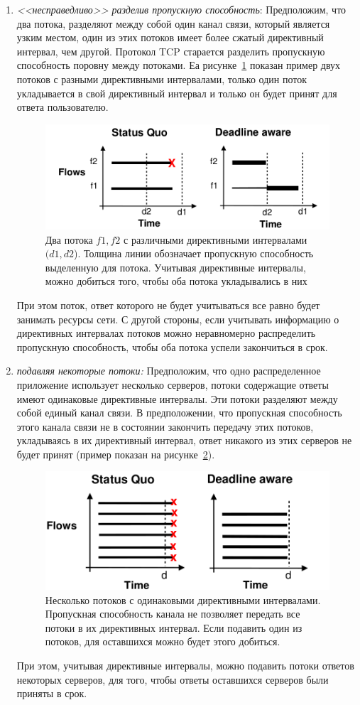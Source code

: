 \documentclass[14pt, a4paper,oneside]{extarticle}
\begin{document}
\begin{enumerate}
\item \emph{<<несправедливо>> разделив пропускную способность}: 
Предположим, что два потока, разделяют между собой один канал связи, который является узким местом, один из этих потоков имеет более сжатый директивный интервал, чем другой. Протокол TCP старается разделить пропускную способность поровну между потоками. Еа рисунке~\ref{fairness_two_flow} показан пример двух потоков с разными директивными интервалами, только один поток укладывается в свой директивный интервал и только он будет принят для ответа пользователю. 
\begin{figure}
	\includegraphics[width=0.7\linewidth]{fairness_two_flow}
	\caption{Два потока $f1, f2$ с различными директивными интервалами $(d1, d2$). Толщина линии обозначает пропускную способность выделенную для потока. Учитывая директивные интервалы, можно добиться того, чтобы оба потока укладывались в них}
	\label{fairness_two_flow}
\end{figure}
При этом поток, ответ которого не будет учитываться все равно будет занимать ресурсы сети. С другой стороны, если учитывать информацию о директивных интервалах потоков можно неравномерно распределить пропускную способность, чтобы оба потока успели закончиться в срок.

\item \emph{подавляя некоторые потоки:}
Предположим, что одно распределенное приложение использует несколько серверов, потоки содержащие ответы имеют одинаковые директивные интервалы. Эти потоки разделяют между собой единый канал связи. В предположении, что пропускная способность этого канала связи не в состоянии закончить передачу этих потоков, укладываясь в их директивный интервал, ответ никакого из этих серверов не будет принят (пример показан на рисунке~\ref{fairness_many_flows}).
\begin{figure}
	\includegraphics[width=0.7\linewidth]{fairness_many_flows}
	\caption{Несколько потоков с одинаковыми директивными интервалами. Пропускная способность канала не позволяет передать все потоки в их директивных интервал. Если подавить один из потоков, для оставшихся можно будет этого добиться.}
	\label{fairness_many_flows}
\end{figure} При этом, учитывая директивные интервалы, можно подавить потоки ответов некоторых серверов, для того, чтобы ответы оставшихся серверов были приняты в срок.
\end{enumerate}
\end{document}
